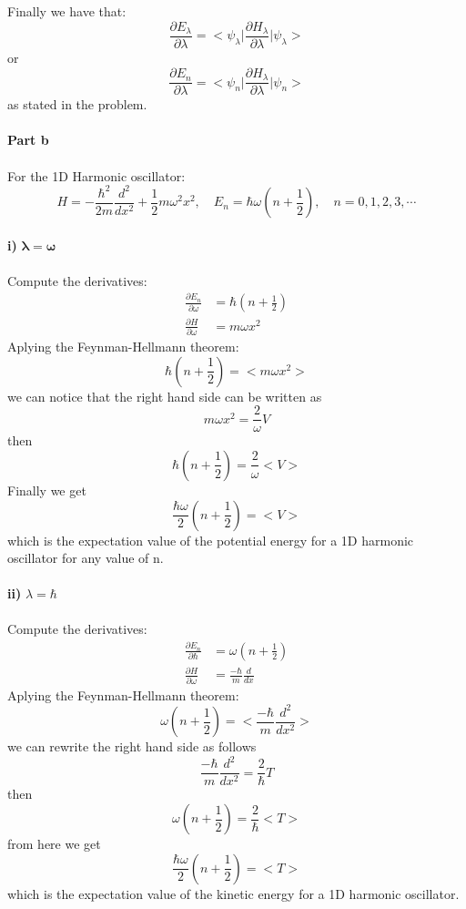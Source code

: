 \documentclass[12 pt]{article}
\numberwithin{equation}{section}
\begin{document}
Finally we have that: 
\[
 \frac{\partial E_\lambda}{\partial \lambda}=\bigg<\psi_\lambda\bigg|\frac{\partial
 H_\lambda}{\partial \lambda}\bigg|\psi_\lambda\bigg> 
\]
or 
\[
  \frac{\partial E_n}{\partial \lambda}=\bigg<\psi_n\bigg|\frac{\partial
 H_\lambda}{\partial \lambda}\bigg|\psi_n\bigg>  
\]
as stated in the problem. \\
\\
\textbf{Part b}\\
\\
For the 1D Harmonic oscillator:
\[
  H = -\frac{\hbar^2}{2m}\frac{d^2}{dx^2} +\frac{1}{2}m\omega^2 x^2,\quad 
  E_n = \hbar\omega\left(n+\frac{1}{2} \right), \quad n=0,1,2,3,\cdots
\]
\\
\textbf{ i)}  $\mathbf{\lambda = \omega}$\\
 \\
 Compute the derivatives:
 \begin{align*}
   \frac{\partial E_n}{\partial \omega} &= \hbar\left(n+\frac{1}{2}\right)\\
  \frac{\partial H}{\partial \omega}&= m\omega x^2
\end{align*}
Aplying the Feynman-Hellmann theorem: 
\[
  \hbar\left(n+\frac{1}{2}\right) = \bigg<m\omega x^2\bigg>
\]
we can notice that the right hand side can be written as 
\[
  m\omega x^2 = \frac{2}{\omega} V
\]
then 
\[
  \hbar\left(n+\frac{1}{2}\right) = \frac{2}{\omega}\bigg<V\bigg>
\]
Finally we get
\[
  \boxed{ \frac{\hbar\omega}{2}\left(n+\frac{1}{2}\right) = \bigg<V\bigg>}
\]
which is the expectation value of the potential energy
for a 1D harmonic oscillator for any value of n.\\
\\
\textbf{ii) }$\lambda = \hbar$\\
\\
Compute the derivatives:
\begin{align*}
  \frac{\partial E_n}{\partial \hbar} &= \omega\left(n+\frac{1}{2}\right)\\
  \frac{\partial H}{\partial \omega}&= \frac{-\hbar}{m}\frac{d}{dx}
\end{align*}
Aplying the Feynman-Hellmann theorem:
\[
 \omega\left(n+\frac{1}{2}\right) = \bigg< \frac{-\hbar}{m}\frac{d^2}{dx^2}
\bigg> 
\]
we can rewrite the right hand side as follows
\[
  \frac{-\hbar}{m}\frac{d^2}{dx^2} = \frac{2}{\hbar} T
\]
then 
\[
 \omega\left(n+\frac{1}{2}\right) = \frac{2}{\hbar}\bigg<T\bigg> 
\]
from here we get
\[
  \boxed{\frac{\hbar\omega}{2}\left(n+\frac{1}{2}\right) = \bigg<T\bigg>}
\]
which is the expectation value of the kinetic energy for a 1D harmonic oscillator. \\
\end{document}
